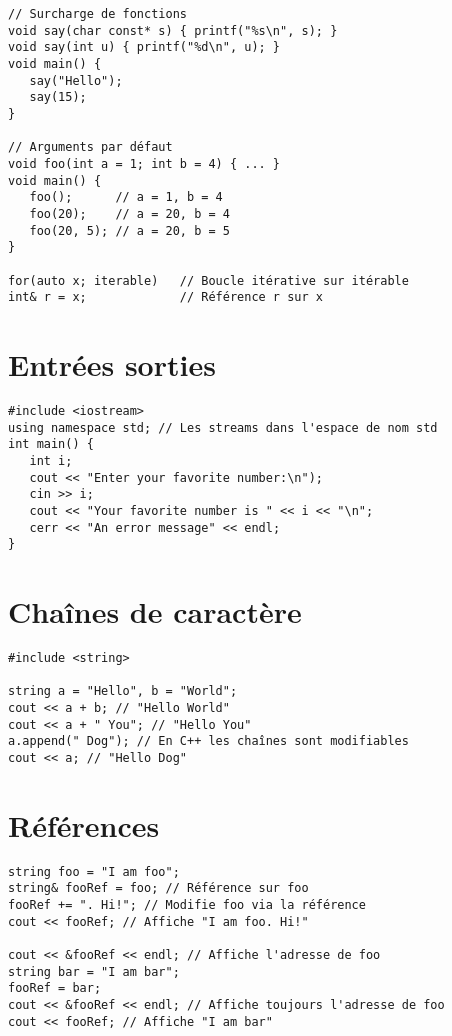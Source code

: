 \documentclass{article}
\begin{document}
\begin{multicols*}{3}
\begin{lstlisting}
// Surcharge de fonctions
void say(char const* s) { printf("%s\n", s); }
void say(int u) { printf("%d\n", u); }
void main() {
   say("Hello");
   say(15);
}

// Arguments par défaut
void foo(int a = 1; int b = 4) { ... }
void main() {
   foo();      // a = 1, b = 4
   foo(20);    // a = 20, b = 4
   foo(20, 5); // a = 20, b = 5
}

for(auto x; iterable)   // Boucle itérative sur itérable
int& r = x;             // Référence r sur x
\end{lstlisting}

\section*{Entrées sorties}

\begin{lstlisting}
#include <iostream>
using namespace std; // Les streams dans l'espace de nom std
int main() {
   int i;
   cout << "Enter your favorite number:\n");
   cin >> i;
   cout << "Your favorite number is " << i << "\n";
   cerr << "An error message" << endl;
}
\end{lstlisting}

\section*{Chaînes de caractère}

\begin{lstlisting}
#include <string>

string a = "Hello", b = "World";
cout << a + b; // "Hello World"
cout << a + " You"; // "Hello You"
a.append(" Dog"); // En C++ les chaînes sont modifiables
cout << a; // "Hello Dog"
\end{lstlisting}

\section*{Références}

\begin{lstlisting}
string foo = "I am foo";
string& fooRef = foo; // Référence sur foo
fooRef += ". Hi!"; // Modifie foo via la référence
cout << fooRef; // Affiche "I am foo. Hi!"

cout << &fooRef << endl; // Affiche l'adresse de foo
string bar = "I am bar";
fooRef = bar;
cout << &fooRef << endl; // Affiche toujours l'adresse de foo
cout << fooRef; // Affiche "I am bar"


\end{lstlisting}
\end{multicols*}
\end{document}
